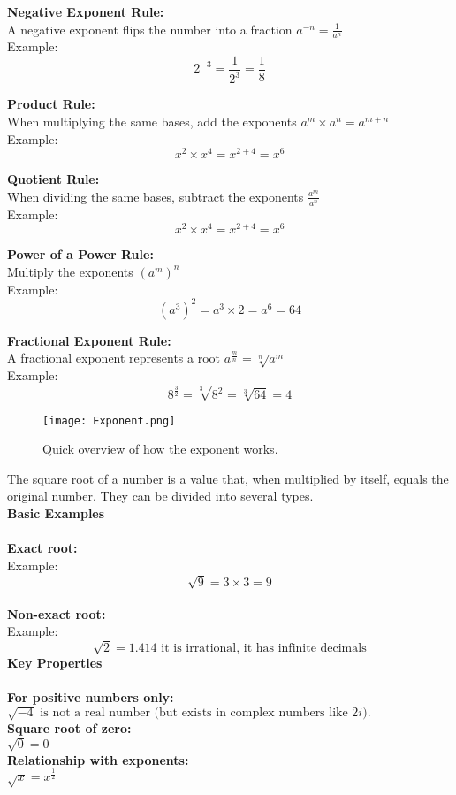 \documentclass{article} %
\begin{document}
\noindent\textbf{Negative Exponent Rule:}\\
A negative exponent flips the number into a fraction $a^{-n} = \frac{1}{a^{n}}$\\
Example:\\
\[
2^{-3} = \frac{1}{2^{3}} = \frac{1}{8} 
\]

\noindent\textbf{Product Rule:}\\
When multiplying the same bases, add the exponents $a^{m} \times a^{n} = a^{m + n}$\\
Example:\\
\[
x^{2} \times x^{4} = x^{2 + 4} = x^{6}
\]

\noindent\textbf{Quotient Rule:}\\
When dividing the same bases, subtract the exponents $\frac{a^{m}}{a^{n}}$\\
Example:\\
\[
x^{2} \times x^{4} = x^{2 + 4} = x^{6}
\]

\noindent\textbf{Power of a Power Rule:}\\
Multiply the exponents $(a^{m})^{n}$\\
Example:\\
\[
(a^{3})^{2} = a^3\times 2 = a^{6} = 64
\]

\noindent\textbf{Fractional Exponent Rule:}\\
A fractional exponent represents a root $a^{\frac{m}{n}} = \sqrt[n]{a^{m}}$\\
Example:\\
\[
8^{\frac{3}{2}} = \sqrt[3]{8^{2}} = \sqrt[3]{64} = 4
\]


\begin{figure}[H]
    \centering
    \texttt{[image: Exponent.png]}
    \caption{Quick overview of how the exponent works.}
    \label{fig:etiqueta}
\end{figure}

The square root of a number is a value that, when multiplied by itself, equals the original number. They can be divided into several types.
\\
\textbf{Basic Examples}\\
\\
\textbf{Exact root:}\\
Example:\\
\[
\sqrt{9} = 3 \times 3 = 9
\]
\\
\textbf{Non-exact root:}\\
Example:\\
\[
\sqrt{2} = 1.414 \text{ it is irrational, it has infinite decimals}
\]
\textbf{Key Properties}\\
\\
\textbf{For positive numbers only:}\\
$\sqrt{-4} \text{ is not a real number (but exists in complex numbers like \(2i\)).}$
\\
\textbf{Square root of zero:}\\
$\sqrt{0} = 0$
\\
\textbf{Relationship with exponents:}\\
$\sqrt{x} = x^{\frac{1}{2}}$
\end{document}
